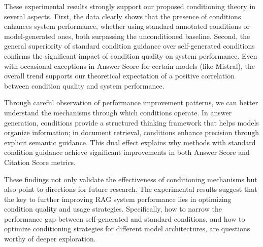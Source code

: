 These experimental results strongly support our proposed conditioning theory in several aspects. First, the data clearly shows that the presence of conditions enhances system performance, whether using standard annotated conditions or model-generated ones, both surpassing the unconditioned baseline. Second, the general superiority of standard condition guidance over self-generated conditions confirms the significant impact of condition quality on system performance. Even with occasional exceptions in Answer Score for certain models (like Mistral), the overall trend supports our theoretical expectation of a positive correlation between condition quality and system performance.

Through careful observation of performance improvement patterns, we can better understand the mechanisms through which conditions operate. In answer generation, conditions provide a structured thinking framework that helps models organize information; in document retrieval, conditions enhance precision through explicit semantic guidance. This dual effect explains why methods with standard condition guidance achieve significant improvements in both Answer Score and Citation Score metrics.

These findings not only validate the effectiveness of conditioning mechanisms but also point to directions for future research. The experimental results suggest that the key to further improving RAG system performance lies in optimizing condition quality and usage strategies. Specifically, how to narrow the performance gap between self-generated and standard conditions, and how to optimize conditioning strategies for different model architectures, are questions worthy of deeper exploration.





